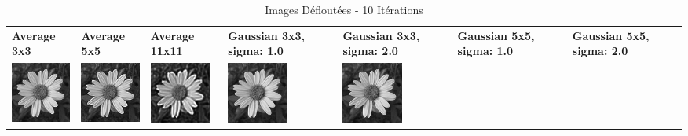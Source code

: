 \begin{table}[h!]
    \centering
    \captionsetup{justification=centering}
    \caption*{Images Défloutées - 10 Itérations}
    \begin{tabular}{>{\centering\arraybackslash} m{2cm} >{\centering\arraybackslash} m{2cm} >{\centering\arraybackslash} m{2cm} >{\centering\arraybackslash} m{2cm} >{\centering\arraybackslash} m{2cm} >{\centering\arraybackslash} m{2cm} >{\centering\arraybackslash} m{2cm}}
        \textbf{Average 3x3}                                                                             & \textbf{Average 5x5} & \textbf{Average 11x11} & \textbf{Gaussian 3x3, sigma: 1.0} & \textbf{Gaussian 3x3, sigma: 2.0} & \textbf{Gaussian 5x5, sigma: 1.0} & \textbf{Gaussian 5x5, sigma: 2.0} \\
        \includegraphics[width=2cm]{images/processed/flower/average_3x3/unblurred_10-iter.png}           &
        \includegraphics[width=2cm]{images/processed/flower/average_5x5/unblurred_10-iter.png}           &
        \includegraphics[width=2cm]{images/processed/flower/average_11x11/unblurred_10-iter.png}         &
        \includegraphics[width=2cm]{images/processed/flower/gaussian_3x3_sigma1.0/unblurred_10-iter.png} &
        \includegraphics[width=2cm]{images/processed/flower/gaussian_3x3_sigma2.0/unblurred_10-iter.png} &

\end{tabular}
\end{table}
